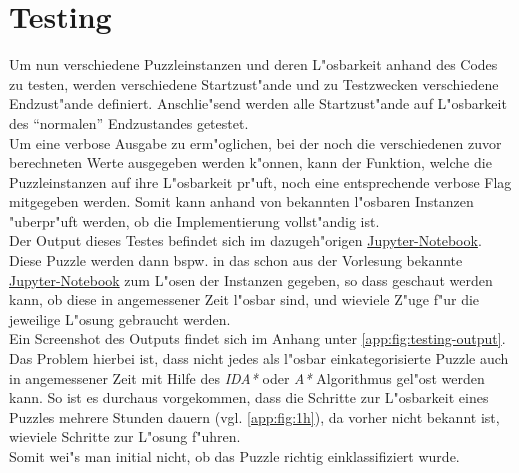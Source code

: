 \section{Testing} %
\label{cha:Testing}
Um nun verschiedene Puzzleinstanzen und deren L"osbarkeit anhand des Codes zu testen, werden verschiedene Startzust"ande und zu Testzwecken verschiedene Endzust"ande definiert. Anschlie"send werden alle Startzust"ande auf L"osbarkeit des \enquote{normalen} Endzustandes getestet.\\
Um eine verbose Ausgabe zu erm"oglichen, bei der noch die verschiedenen zuvor berechneten Werte ausgegeben werden k"onnen, kann der Funktion, welche die Puzzleinstanzen auf ihre L"osbarkeit pr"uft, noch eine entsprechende verbose Flag mitgegeben werden. Somit kann anhand von bekannten l"osbaren Instanzen "uberpr"uft werden, ob die Implementierung vollst"andig ist.\\
Der Output dieses Testes befindet sich im dazugeh"origen \textcolor{violet}{\href{https://github.com/stubifox/ai-termpaper/blob/main/code/15-solvable-v1.ipynb}{Jupyter-Notebook}}.\\
Diese Puzzle werden dann bspw. in das schon aus der Vorlesung bekannte \textcolor{violet}{\href{https://github.com/karlstroetmann/Artificial-Intelligence/blob/master/Python/1\%20Search/Iterative-Deepening-A-Star-Search.ipynb}{Jupyter-Notebook}} zum L"osen der Instanzen gegeben, so dass geschaut werden kann, ob diese in angemessener Zeit l"osbar sind, und wieviele Z"uge f"ur die jeweilige L"osung gebraucht werden. \\
Ein Screenshot des Outputs findet sich im Anhang unter \ref{app:fig:testing-output}.
Das Problem hierbei ist, dass nicht jedes als l"osbar einkategorisierte Puzzle auch in angemessener Zeit mit Hilfe des \textit{IDA*} oder \textit{A*} Algorithmus gel"ost werden kann. So ist es durchaus vorgekommen, dass die Schritte zur L"osbarkeit eines Puzzles mehrere Stunden dauern (vgl. \ref{app:fig:1h}), da vorher nicht bekannt ist, wieviele Schritte zur L"osung f"uhren.\\
Somit wei"s man initial nicht, ob das Puzzle richtig einklassifiziert wurde.
